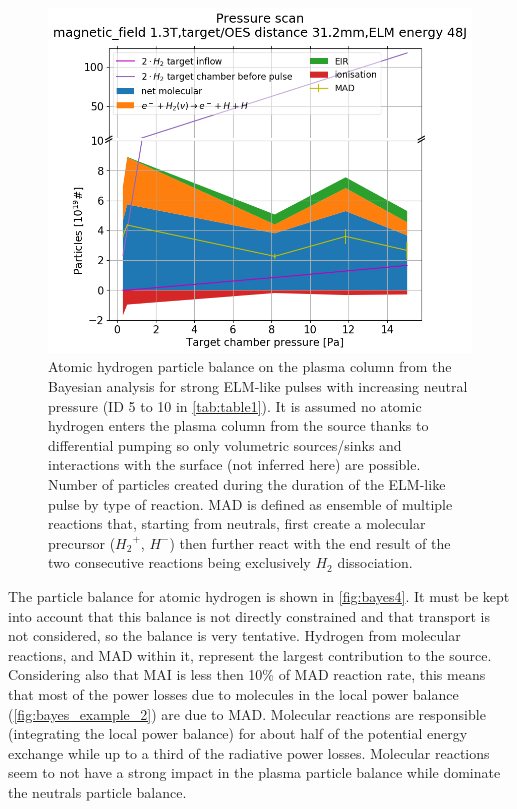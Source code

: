 \begin{figure}[!ht]
        \centering
    	\includegraphics[width=0.7\linewidth,trim={35 5 60 50},clip]{Chapters/chapter3/figs/Bayesian_strong_7.png}
	\caption{Atomic hydrogen particle balance on the plasma column from the Bayesian analysis for strong ELM-like pulses with increasing neutral pressure (ID 5 to 10 in \autoref{tab:table1}). It is assumed no atomic hydrogen enters the plasma column from the source thanks to differential pumping so only volumetric sources/sinks and interactions with the surface (not inferred here) are possible. Number of particles created during the duration of the ELM-like pulse by type of reaction. MAD is defined as ensemble of multiple reactions that, starting from neutrals, first create a molecular precursor (${H_2}^+$, $H^-$) then further react with the end result of the two consecutive reactions being exclusively $H_2$ dissociation.\cite{Verhaegh2020}}
	\label{fig:bayes4}
\end{figure}

The particle balance for atomic hydrogen is shown in \autoref{fig:bayes4}. It must be kept into account that this balance is not directly constrained and that transport is not considered, so the balance is very tentative. Hydrogen from molecular reactions, and MAD within it, represent the largest contribution to the source. Considering also that MAI is less then 10\% of MAD reaction rate, this means that most of the power losses due to molecules in the local power balance (\autoref{fig:bayes_example_2}) are due to MAD. Molecular reactions are responsible (integrating the local power balance) for about half of the potential energy exchange while up to a third of the radiative power losses. Molecular reactions seem to not have a strong impact in the plasma particle balance while dominate the neutrals particle balance.

